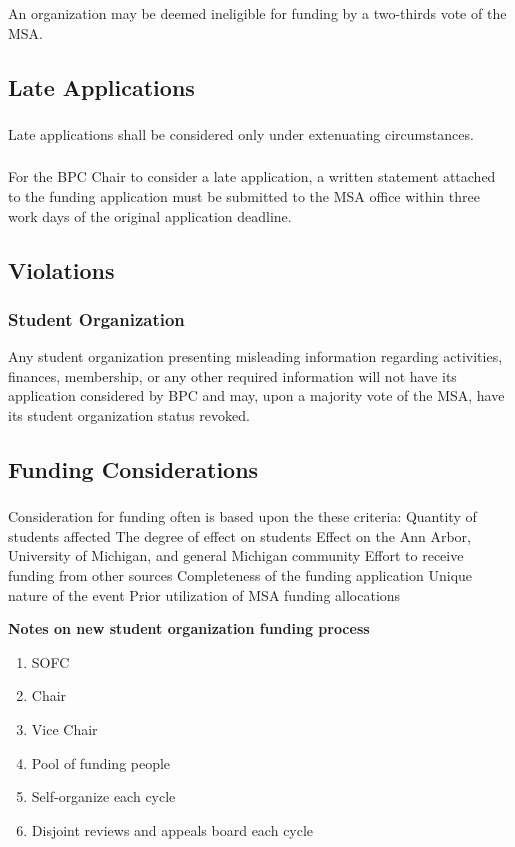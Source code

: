 \subsubsection{}
An organization may be deemed ineligible for funding by a two-thirds vote of the MSA.

\subsection{Late Applications}
\subsubsection{}
Late applications shall be considered only under extenuating circumstances.
\subsubsection{}
For the BPC Chair to consider a late application, a written statement attached to the funding application must be submitted to the MSA office within three work days of the original application deadline.

\subsection{Violations}
\subsubsection{Student Organization}
\subsubsubsection{}
Any student organization presenting misleading information regarding activities, finances, membership, or any other required information will not have its application considered by BPC and may, upon a majority vote of the MSA, have its student organization status revoked. 

\subsection{Funding Considerations}
\subsubsection{}
Consideration for funding often is based upon the these criteria:
\subsubsubsection{}
Quantity of students affected
\subsubsubsection{}
The degree of effect on students
\subsubsubsection{}
Effect on the Ann Arbor, University of Michigan, and general Michigan community
\subsubsubsection{}
Effort to receive funding from other sources
\subsubsubsection{}
Completeness of the funding application
\subsubsubsection{}
Unique nature of the event
\subsubsubsection{}
Prior utilization of MSA funding allocations

\begin{framed}
\textbf{Notes on new student organization funding process}
\begin{enumerate}
\item SOFC
\item Chair
\item Vice Chair
\item Pool of funding people
\item Self-organize each cycle 
\item Disjoint reviews and appeals board each cycle
\end{enumerate}
\end{framed}